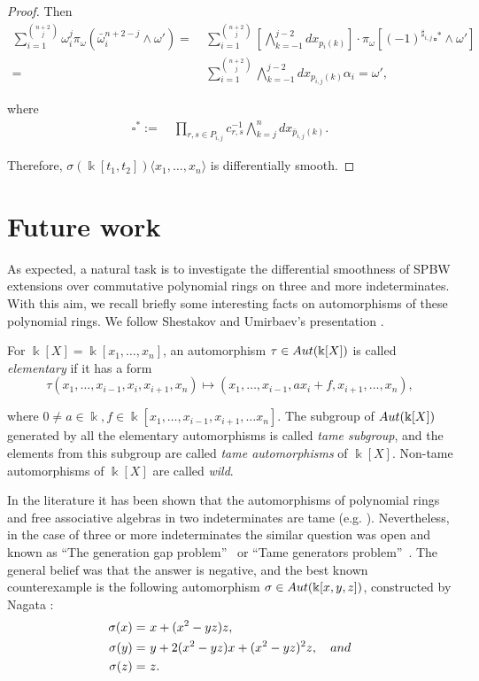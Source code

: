 \documentclass{amsart}
\theoremstyle{definition}
\theoremstyle{remark}
\numberwithin{equation}{section}
\begin{document}
\begin{proof}
Then
\begin{align*}
 \sum_{i=1}^{\binom{n+2}{j}}\omega_{i}^{j}\pi_{\omega}(\bar{\omega}_i^{n+2-j}\wedge \omega') = &\ \sum_{i=1}^{\binom{n+2}{j}}\left[\bigwedge_{k=-1}^{j-2}dx_{p_i(k)}\right] \cdot  \pi_{\omega} \left[(-1)^{\sharp_{i,j}} \square^{*} \wedge \omega'\right] \\
 = &\ \displaystyle \sum_{i=1}^{\binom{n+2}{j}}\bigwedge_{k=-1}^{j-2}dx_{p_{i,j}(k)}\alpha_i =  \omega',
\end{align*}

where 
\begin{align*}
    \square^{*} := &\ \prod_{r,s\in P_{i,j}}c_{r,s}^{-1} \bigwedge_{k=j}^{n}dx_{\bar{p}_{i,j}(k)}.
\end{align*}

Therefore, $\sigma(\Bbbk[t_1, t_2])\langle x_1, \ldots, x_n \rangle$ is differentially smooth.
\end{proof}


\section{Future work}\label{FutureworkDSSPBW}

As expected, a natural task is to investigate the differential smoothness of SPBW extensions over commutative polynomial rings on three and more indeterminates. With this aim, we recall briefly some interesting facts on automorphisms of these polynomial rings. We follow Shestakov and Umirbaev's presentation \cite[p. 197]{ShestakovUmirbaev2003}.

For $\Bbbk[X] = \Bbbk[x_1, \dotsc, x_n]$, an automorphism $\tau \in {\rm Aut}(\Bbbk[X])$ is called {\em elementary} if it has a form
\[
\tau (x_1, \dotsc, x_{i-1}, x_i, x_{i+1}, x_n) \mapsto (x_1, \dotsc, x_{i-1}, ax_i + f, x_{i+1}, \dotsc, x_n),
\]

where $0\neq a\in \Bbbk, f\in \Bbbk[x_1, \dotsc, x_{i-1}, x_{i+1}, \dotsc x_n]$. The subgroup of ${\rm Aut}(\Bbbk[X])$ generated by all the elementary automorphisms is called {\em tame subgroup}, and the elements from this subgroup are called {\em tame automorphisms} of $\Bbbk[X]$. Non-tame automorphisms of $\Bbbk[X]$ are called {\em wild}.

In the literature it has been shown that the automorphisms of polynomial rings and free associative algebras in two indeterminates are tame (e.g. \cite{McKayWang1988, VandenEssen2000}). Nevertheless, in the case of three or more indeterminates the similar question was open and known as \textquotedblleft The generation gap problem\textquotedblright\ \cite{VandenEssen2000} or \textquotedblleft Tame generators problem\textquotedblright\ \cite{VandenEssen2000}. The general belief was that the answer is negative, and the best known counterexample is the following automorphism $\sigma \in {\rm Aut}(\Bbbk[x, y, z])$, constructed by Nagata \cite{Nagata1972}:
\begin{align*}
    \sigma(x) = &\ x + (x^2 - yz)z, \\
    \sigma(y) = &\ y + 2(x^2 - yz)x + (x^2 - yz)^2 z, \quad {\rm and} \\
    \sigma(z) = &\ z.
\end{align*}
\end{document}
